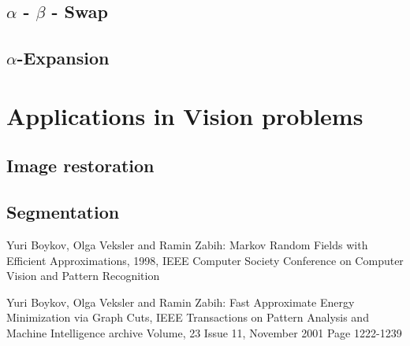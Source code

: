 \documentclass{scrartcl}[12pt, halfparskip]
\begin{document}
\subsection{$\alpha$ - $\beta$ - Swap}
\subsection{$\alpha$-Expansion}

\section{Applications in Vision problems}
\subsection{Image restoration}
\subsection{Segmentation}




\begin{thebibliography}{9}

  Yuri Boykov, Olga Veksler and Ramin Zabih:
  Markov Random Fields with Efficient Approximations,
  1998,
  IEEE Computer Society Conference on Computer Vision and
  Pattern Recognition
  
  Yuri Boykov, Olga Veksler and Ramin Zabih:
  Fast Approximate Energy Minimization via Graph
  Cuts,
  IEEE Transactions on Pattern Analysis and Machine Intelligence archive Volume,
  23 Issue 11, November 2001 Page 1222-1239
  

  

\end{thebibliography}
\end{document}
